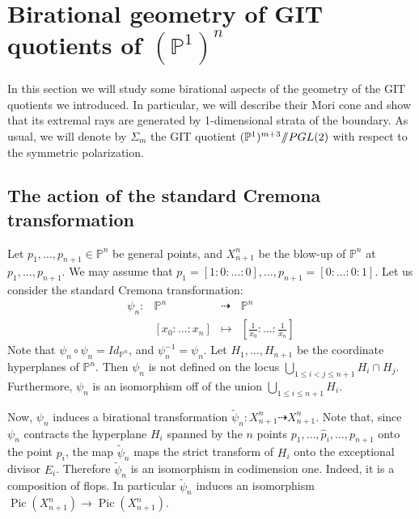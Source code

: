 \documentclass[a4paper,10pt]{amsart}
\theoremstyle{definition}
\renewcommand{\P}{\mathbb{P}}
\DeclareMathOperator{\Pic}{Pic}
\newcommand{\quot}{/\hspace{-1.2mm}/}
\begin{document}
\section{Birational geometry of GIT quotients of $(\mathbb{P}^1)^n$}\label{secbir}
In this section we will study some birational aspects of the geometry of the GIT quotients we introduced. In particular, we will describe their Mori cone and show that its extremal rays are generated by 1-dimensional strata of the boundary. As usual, we will denote by $\Sigma_m$ the GIT quotient $(\P^1)^{m+3}\quot PGL(2)$ with respect to the symmetric polarization.

\subsection{The action of the standard Cremona transformation}
Let $p_1,\dots,p_{n+1}\in\mathbb{P}^n$ be general points, and $X_{n+1}^n$ be the blow-up of $\mathbb{P}^n$ at $p_1,\dots,p_{n+1}$. We may assume that $p_1 = [1:0:\dots:0],\dots,p_{n+1} = [0:\dots:0:1]$. Let us consider the standard Cremona transformation:
$$
\begin{array}{cccc}
\psi_n: & \mathbb{P}^n & \dasharrow & \mathbb{P}^n\\
 & \left[x_0:\dots:x_n\right] & \longmapsto & [\frac{1}{x_0}:\dots:\frac{1}{x_n}]
\end{array}
$$
Note that $\psi_n\circ \psi_n = Id_{\mathbb{P}^n}$, and $\psi^{-1}_n = \psi_n$. Let $H_1,\dots,H_{n+1}$ be the coordinate hyperplanes of $\mathbb{P}^n$. Then $\psi_n$ is not defined on the locus $\bigcup_{1\leq i< j\leq n+1}H_i\cap H_j$. Furthermore, $\psi_n$ is an isomorphism off of the union $\bigcup_{1\leq i\leq n+1}H_i$.

Now, $\psi_n$ induces a birational transformation $\widetilde{\psi}_n:X_{n+1}^n\dasharrow X_{n+1}^n$. Note that, since $\psi_n$ contracts the hyperplane $H_i$ spanned by the $n$ points $p_1,\dots,\hat{p}_i,\dots,p_{n+1}$ onto the point $p_i$, the map $\widetilde{\psi}_n$ maps the strict transform of $H_i$ onto the exceptional divisor $E_i$. Therefore $\widetilde{\psi}_n$ is an isomorphism in codimension one. Indeed, it is a composition of flops. In particular $\widetilde{\psi}_n$ induces an isomorphism $\Pic(X_{n+1}^n)\rightarrow\Pic(X_{n+1}^n)$.
\end{document}
